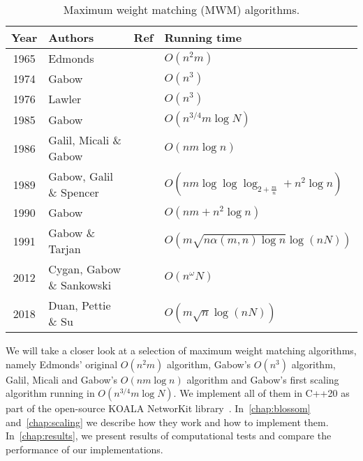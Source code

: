 \begin{table}
\centering
\begin{tabular}{clcl}
\toprule
\textbf{Year} & \textbf{Authors} & \textbf{Ref}                 & \textbf{Running time} \\
\midrule
1965 & Edmonds                   &\cite{edmonds1965maximum}     & $O(n^2m)$ \\
1974 & Gabow                     &\cite{gabow1974implementation}& $O(n^3)$ \\
1976 & Lawler                    &\cite{lawler2001combinatorial}& $O(n^3)$ \\
1985 & Gabow                     &\cite{gabow1985scaling}       & $O(n^{3/4}m \log N)$ \\
1986 & Galil, Micali \& Gabow    &\cite{galil1986ev}            & $O(nm \log n)$ \\
1989 & Gabow, Galil \& Spencer   &\cite{gabow1989faster}        & $O(nm \log \log \log_{2 + \frac{m}{n}} + n^2\log n)$ \\
1990 & Gabow                     &\cite{gabow1990data}          & $O(nm + n^2 \log n)$ \\
1991 & Gabow \& Tarjan           &\cite{gabow1991faster}        & $O(m \sqrt{n \alpha(m, n) \log n} \log (nN))$ \\
2012 & Cygan, Gabow \& Sankowski &\cite{cygan2015algorithmic}   & $O(n^\omega N)$ \\
2018 & Duan, Pettie \& Su        &\cite{duan2018scaling}        & $O(m \sqrt{n} \log(nN))$ \\
\bottomrule
\end{tabular}
\caption{Maximum weight matching (\textsc{MWM}) algorithms.}\label{tab:mwm_alogrithms}
\end{table}


We will take a closer look at a selection of maximum weight matching algorithms, namely Edmonds' original $O(n^2m)$ algorithm, Gabow's $O(n^3)$ algorithm, Galil, Micali and Gabow's $O(nm \log n)$ algorithm and Gabow's first scaling algorithm running in $O(n^{3/4}m \log N)$. We implement all of them in C++20 as part of the open-source KOALA NetworKit library~\cite{koala-networkit}. In~\autoref{chap:blossom} and~\autoref{chap:scaling} we describe how they work and how to implement them. In~\autoref{chap:results}, we present results of computational tests and compare the performance of our implementations.
